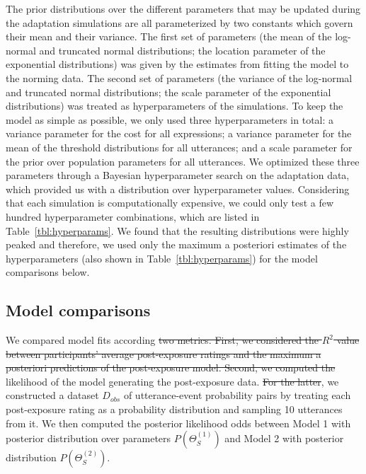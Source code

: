 \documentclass[man, floatsintext]{apa6}
\providecommand{\DIFadd}[1]{{\protect\color{blue}\uwave{#1}}} %
\providecommand{\DIFdel}[1]{{\protect\color{red}\sout{#1}}}                      %
\providecommand{\DIFaddbegin}{} %
\providecommand{\DIFaddend}{} %
\providecommand{\DIFdelbegin}{} %
\providecommand{\DIFdelend}{} %
\newcommand{\DIFscaledelfig}{0.5}
\newlength{\DIFdelgraphicswidth} %
\newlength{\DIFdelgraphicsheight} %
\newcommand{\DIFaddincludegraphics}[2][]{{\color{blue}\fbox{\DIFOincludegraphics[#1]{#2}}}} %
\newcommand{\DIFdelincludegraphics}[2][]{%
\sbox{\DIFdelgraphicsbox}{\DIFOincludegraphics[#1]{#2}}%
\settoboxwidth{\DIFdelgraphicswidth}{\DIFdelgraphicsbox} %
\settoboxtotalheight{\DIFdelgraphicsheight}{\DIFdelgraphicsbox} %
\scalebox{\DIFscaledelfig}{%
\parbox[b]{\DIFdelgraphicswidth}{\usebox{\DIFdelgraphicsbox}\\[-\baselineskip] \rule{\DIFdelgraphicswidth}{0em}}\llap{\resizebox{\DIFdelgraphicswidth}{\DIFdelgraphicsheight}{%
\setlength{\unitlength}{\DIFdelgraphicswidth}%
\begin{picture}(1,1)%
\thicklines\linethickness{2pt} %
{\color[rgb]{1,0,0}\put(0,0){\framebox(1,1){}}}%
{\color[rgb]{1,0,0}\put(0,0){\line( 1,1){1}}}%
{\color[rgb]{1,0,0}\put(0,1){\line(1,-1){1}}}%
\end{picture}%
}\hspace*{3pt}}} %
} %
\DeclareRobustCommand{\DIFaddbegin}{\DIFOaddbegin \let\includegraphics\DIFaddincludegraphics} %
\DeclareRobustCommand{\DIFaddend}{\DIFOaddend \let\includegraphics\DIFOincludegraphics} %
\DeclareRobustCommand{\DIFdelbegin}{\DIFOdelbegin \let\includegraphics\DIFdelincludegraphics} %
\DeclareRobustCommand{\DIFdelend}{\DIFOaddend \let\includegraphics\DIFOincludegraphics} %
\begin{document}
The prior distributions over the different parameters that may be updated during the adaptation simulations are all parameterized by two constants which govern their mean and their variance. The first set of parameters (the mean of the log-normal and truncated normal distributions; the location parameter of the exponential distributions) was given by the estimates from fitting the model to the norming data. The second set of parameters (the variance of the log-normal and truncated normal distributions; the scale parameter of the exponential distributions) was treated as hyperparameters of the simulations. To keep the model as simple as possible, we only used three hyperparameters in total: a variance parameter for the cost for all expressions; a variance parameter for the mean of the threshold distributions for all utterances; and a scale parameter for the prior over population parameters for all utterances. We optimized these three parameters through a Bayesian hyperparameter search on the adaptation data, which provided us with a distribution over hyperparameter values. Considering that each simulation is computationally expensive, we could only test a few hundred hyperparameter combinations, which are listed in Table~\ref{tbl:hyperparams}. We found that the resulting distributions were highly peaked and therefore, we used only the maximum a posteriori estimates of the hyperparameters (also shown in Table~\ref{tbl:hyperparams}) for the model comparisons below.


\subsection{Model comparisons}

We compared model fits according \DIFdelbegin \DIFdel{two metrics. First, we considered the $R^2$ value between participants' average post-exposure ratings and the maximum a posteriori predictions of the post-exposure model. Second, we computed the }\DIFdelend \DIFaddbegin \DIFadd{to the }\DIFaddend likelihood of the model generating the post-exposure data. \DIFdelbegin \DIFdel{For the latter}\DIFdelend \DIFaddbegin \DIFadd{To compute this metric}\DIFaddend , we constructed a dataset $D_{obs}$ of utterance-event probability pairs by treating each post-exposure rating as a probability distribution and sampling 10 utterances from it. We then computed the posterior likelihood odds between Model 1 with posterior distribution over parameters $P(\Theta_{S}^{(1)})$ and Model 2 with posterior distribution $P(\Theta_{S}^{(2)})$.
\end{document}

